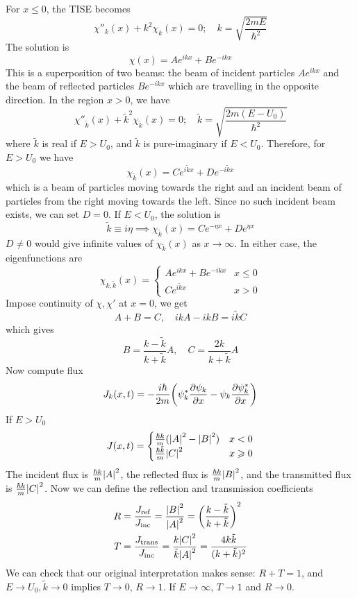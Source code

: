 \documentclass[a4paper]{article}
\begin{document}
For \( x \leq 0 \), the TISE becomes
\[
	\chi''_k(x) + k^2 \chi_k(x) = 0;\quad k = \sqrt{\frac{2mE}{\hbar^2}}
\]
The solution is
\[
	\chi(x) = Ae^{ikx} + Be^{-ikx}
\]
This is a superposition of two beams: the beam of incident particles \( Ae^{ikx} \) and the beam of reflected particles \( Be^{-ikx} \) which are travelling in the opposite direction.
In the region \( x > 0 \), we have
\[
	\chi''_{\tilde k}(x) + \tilde k^2 \chi_{\tilde k}(x) = 0;\quad \tilde k = \sqrt{\frac{2m(E-U_0)}{\hbar^2}}
\]
where \( \tilde k \) is real if \( E > U_0 \), and \( \tilde k \) is pure-imaginary if \( E < U_0 \).
Therefore, for \( E > U_0 \) we have
\[
	\chi_{\tilde k}(x) = Ce^{i \tilde k x} + De^{-i \tilde k x}
\]
which is a beam of particles moving towards the right and an incident beam of particles from the right moving towards the left.
Since no such incident beam exists, we can set \( D = 0 \).
If \( E < U_0 \), the solution is
\[
	\tilde k \equiv i \eta \implies \chi_{\tilde k}(x) = Ce^{-\eta x} + De^{\eta x}
\]
\( D \neq 0 \) would give infinite values of \( \chi_{\tilde k}(x) \) as \( x \to \infty \).
In either case, the eigenfunctions are
\[
	\chi_{k, \tilde k}(x) =
	\begin{cases}
		Ae^{ikx} + Be^{-ikx} & x \leq 0 \\
		Ce^{i \tilde k x} & x > 0
	\end{cases}
\]
Impose continuity of $\chi,\chi'$ at $x=0$, we get
\[
	A + B = C,\quad ikA - ikB = i\tilde k C
\]
which gives
\[
	B = \frac{k - \tilde k}{k + \tilde k} A,\quad C = \frac{2k}{k + \tilde k}A
\]
Now compute flux
\[
	J_k(x,t) = - \frac{i\hbar}{2m} \qty(\psi^*_k \pdv{\psi_k}{x} - \psi_k \pdv{\psi_k^*}{x})
\]
If \( E > U_0 \)
\[
	J(x,t) =
	\begin{cases}
		\frac{\hbar k}{m} (\abs{A}^2 - \abs{B}^2) & x < 0    \\
		\frac{\hbar \tilde k}{m} \abs{C}^2     & x \geqslant 0
	\end{cases}
\]
The incident flux is \( \frac{\hbar k}{m} \abs{A}^2 \), the reflected flux is \( \frac{\hbar k}{m} \abs{B}^2 \), and the transmitted flux is \( \frac{\hbar k}{m} \abs{C}^2 \).
Now we can define the reflection and transmission coefficients 
\begin{align*}
    R &= \frac{J_{\text{ref}}}{J_{\text{inc}}} = \frac{\abs{B}^2}{\abs{A}^2} = \qty(\frac{k - \tilde k}{k + \tilde k})^2\\ 
	T &= \frac{J_{\text{trans}}}{J_{\text{inc}}} = \frac{k\abs{C}^2}{\tilde k\abs{A}^2} = \frac{4k \tilde k}{(k + \tilde k)^2}
\end{align*}
We can check that our original interpretation makes sense: \( R + T = 1 \), and \( E \to U_0, \tilde k \to 0 \) implies \( T \to 0 \), \( R \to 1 \).
If \( E \to \infty \), \( T \to 1 \) and \( R \to 0 \).
\end{document}
